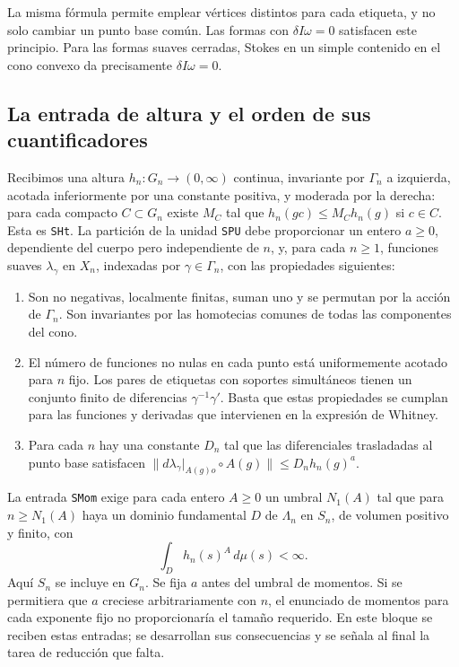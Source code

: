 La misma fórmula permite emplear vértices distintos para cada etiqueta, y no solo cambiar un punto base común. Las formas con $\delta I\omega=0$ satisfacen este principio. Para las formas suaves cerradas, Stokes en un simple contenido en el cono convexo da precisamente $\delta I\omega=0$.

\subsection{La entrada de altura y el orden de sus cuantificadores}

Recibimos una altura $h_n:G_n\to(0,\infty)$ continua, invariante por $\Gamma_n$ a izquierda, acotada inferiormente por una constante positiva, y moderada por la derecha: para cada compacto $C\subset G_n$ existe $M_C$ tal que $h_n(gc)\le M_Ch_n(g)$ si $c\in C$. Esta es \texttt{SHt}. La partición de la unidad \texttt{SPU} debe proporcionar un entero $a\ge0$, dependiente del cuerpo pero independiente de $n$, y, para cada $n\ge1$, funciones suaves $\lambda_\gamma$ en $X_n$, indexadas por $\gamma\in\Gamma_n$, con las propiedades siguientes:

\begin{enumerate}
\item Son no negativas, localmente finitas, suman uno y se permutan por la acción de $\Gamma_n$. Son invariantes por las homotecias comunes de todas las componentes del cono.
\item El número de funciones no nulas en cada punto está uniformemente acotado para $n$ fijo. Los pares de etiquetas con soportes simultáneos tienen un conjunto finito de diferencias $\gamma^{-1}\gamma'$. Basta que estas propiedades se cumplan para las funciones y derivadas que intervienen en la expresión de Whitney.
\item Para cada $n$ hay una constante $D_n$ tal que las diferenciales trasladadas al punto base satisfacen $\|d\lambda_\gamma|_{A(g)o}\circ A(g)\|\le D_nh_n(g)^a$.
\end{enumerate}

La entrada \texttt{SMom} exige para cada entero $A\ge0$ un umbral $N_1(A)$ tal que para $n\ge N_1(A)$ haya un dominio fundamental $D$ de $\Lambda_n$ en $S_n$, de volumen positivo y finito, con
\begin{equation}
 \int_D h_n(s)^A\,d\mu(s)<\infty.
 \label{eq:sh-momento}
\end{equation}
Aquí $S_n$ se incluye en $G_n$. Se fija $a$ antes del umbral de momentos. Si se permitiera que $a$ creciese arbitrariamente con $n$, el enunciado de momentos para cada exponente fijo no proporcionaría el tamaño requerido. En este bloque se reciben estas entradas; se desarrollan sus consecuencias y se señala al final la tarea de reducción que falta.

